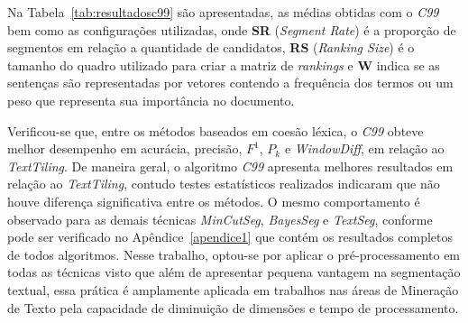   


Na Tabela~\ref{tab:resultadosc99} são apresentadas, as médias obtidas com o \textit{C99} bem como as configurações utilizadas, onde \textbf{SR} (\textit{Segment Rate}) é a proporção de segmentos em relação a quantidade de candidatos, \textbf{RS} (\textit{Ranking Size}) é o tamanho do quadro utilizado para criar a matriz de \textit{rankings} e \textbf{W} indica se as sentenças são representadas por vetores contendo a frequência dos termos ou um peso que representa sua importância no documento. %



Verificou-se que, entre os métodos baseados em coesão léxica, o \textit{C99} obteve melhor desempenho em acurácia, precisão, $F^1$, $P_k$ e \textit{WindowDiff}, em relação ao \textit{TextTiling}. De maneira geral, o algoritmo \textit{C99} apresenta melhores resultados em relação ao \textit{TextTiling}, contudo testes estatísticos realizados indicaram que não houve diferença significativa entre os métodos. 
O mesmo comportamento é observado para as demais técnicas \textit{MinCutSeg}, \textit{BayesSeg} e \textit{TextSeg}, conforme pode ser verificado no Apêndice~\ref{apendice1} que contém os resultados completos de todos algoritmos.
Nesse trabalho, optou-se por aplicar o pré-processamento em todas as técnicas visto que além de apresentar pequena vantagem na segmentação textual, essa prática é amplamente aplicada em trabalhos nas áreas de Mineração de Texto pela capacidade de diminuição de dimensões e tempo de processamento. 















